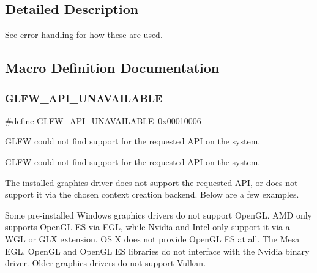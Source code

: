 \subsection{Detailed Description}
See error handling for how these are used. 

\subsection{Macro Definition Documentation}
\mbox{\label{group__errors_ga56882b290db23261cc6c053c40c2d08e}} 
\subsubsection{\texorpdfstring{G\+L\+F\+W\+\_\+\+A\+P\+I\+\_\+\+U\+N\+A\+V\+A\+I\+L\+A\+B\+LE}{GLFW\_API\_UNAVAILABLE}\hspace{0.1cm}{\footnotesize\ttfamily [1/5]}}
{\footnotesize\ttfamily \#define G\+L\+F\+W\+\_\+\+A\+P\+I\+\_\+\+U\+N\+A\+V\+A\+I\+L\+A\+B\+LE~0x00010006}



G\+L\+FW could not find support for the requested A\+PI on the system. 

G\+L\+FW could not find support for the requested A\+PI on the system.

The installed graphics driver does not support the requested A\+PI, or does not support it via the chosen context creation backend. Below are a few examples.

\begin{DoxyParagraph}{}
Some pre-\/installed Windows graphics drivers do not support Open\+GL. A\+MD only supports Open\+GL ES via E\+GL, while Nvidia and Intel only support it via a W\+GL or G\+LX extension. OS X does not provide Open\+GL ES at all. The Mesa E\+GL, Open\+GL and Open\+GL ES libraries do not interface with the Nvidia binary driver. Older graphics drivers do not support Vulkan. 
\end{DoxyParagraph}
\mbox{\label{group__errors_ga56882b290db23261cc6c053c40c2d08e}} 
